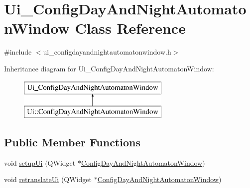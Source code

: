 \hypertarget{class_ui___config_day_and_night_automaton_window}{}\section{Ui\+\_\+\+Config\+Day\+And\+Night\+Automaton\+Window Class Reference}
\label{class_ui___config_day_and_night_automaton_window}


{\ttfamily \#include $<$ui\+\_\+configdayandnightautomatonwindow.\+h$>$}

Inheritance diagram for Ui\+\_\+\+Config\+Day\+And\+Night\+Automaton\+Window\+:\begin{figure}[H]
\begin{center}
\leavevmode
\includegraphics[height=2.000000cm]{class_ui___config_day_and_night_automaton_window}
\end{center}
\end{figure}
\subsection*{Public Member Functions}
\begin{DoxyCompactItemize}
\item 
void \mbox{\hyperlink{class_ui___config_day_and_night_automaton_window_aca0d173a31cd62cdea24365de54b75da}{setup\+Ui}} (Q\+Widget $\ast$\mbox{\hyperlink{class_config_day_and_night_automaton_window}{Config\+Day\+And\+Night\+Automaton\+Window}})
\item 
void \mbox{\hyperlink{class_ui___config_day_and_night_automaton_window_a20ac358fb4dd22f4c2e5b9365152bf1f}{retranslate\+Ui}} (Q\+Widget $\ast$\mbox{\hyperlink{class_config_day_and_night_automaton_window}{Config\+Day\+And\+Night\+Automaton\+Window}})
\end{DoxyCompactItemize}
